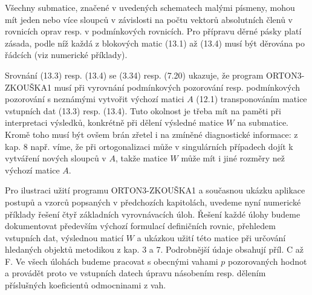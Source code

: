 \noindent
Všechny submatice, značené v uvedených schematech malými
písmeny, mohou mít jeden nebo více sloupců v závislosti na počtu
vektorů absolutních členů v rovnicích oprav resp. v
podmínkových rovnicích. Pro přípravu děrné pásky platí zásada, podle
níž každá z blokových matic (13.1) až (13.4) musí být
děrována po řádcích (viz numerické příklady).


Srovnání  (13.3) resp. (13.4) se (3.34) resp. (7.20)
ukazuje, že program ORTON3-ZKOUŠKA1 musí při vyrovnání podmínkových
pozorování resp. podmínkových pozorování s neznámými vytvořit
výchozí matici $A$ (12.1) transponováním matice vstupních dat
(13.3) resp. (13.4). Tuto okolnost je třeba mít na paměti při
interpretaci výsledků, konkrétně při dělení výsledné matice $W$
na submatice. Kromě toho musí být ovšem brán zřetel i na
zmíněné diagnostické informace: z kap. 8 např. víme, že při
ortogonalizaci může v singulárních případech dojít k 
vytváření nových sloupců v $A$, takže matice $W$ může mít i jiné
rozměry než výchozí matice $A$.

Pro ilustraci užití programu ORTON3-ZKOUŠKA1 a současnou
ukázku aplikace postupů a vzorců popsaných v předchozích
kapitolách, uvedeme nyní numerické příklady řešení čtyř základních
vyrovnávacích úloh. Řešení každé úlohy budeme dokumentovat
především výchozí formulací definičních rovnic, přehledem
vstupních dat, výslednou maticí $W$ a ukázkou užití této matice při
určování hledaných objektů metodikou z kap. 3 a 7. Podrobnější
údaje obsahují příl. C až F. Ve všech úlohách budeme pracovat
s obecnými vahami $p$ pozorovaných hodnot a provádět proto ve
vstupních datech úpravu násobením resp. dělením příslušných
koeficientů odmocninami z vah.


\newenvironment{Example}[1]{%
%
\noindent\hspace*{4ex}\begin{minipage}{6ex}%
%
\ifx&#1&%
\else
   \bigskip\noindent\hspace*{-4ex}\mbox{\underline{#1} :}%
\fi
%
}{\end{minipage}

\medskip
}

\arraycolsep=4pt
\newcommand{\Sep}{&\hspace*{4ex}&}
\newcommand{\Label}[1]{\smallskip\noindent\underline{#1}:$\qquad$}
%





